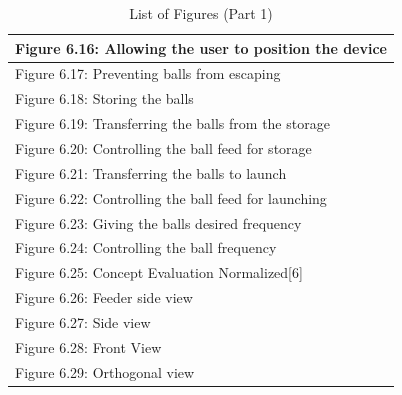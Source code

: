 \documentclass[12pt]{report}
\begin{document}
\begin{table}[h!]
\begin{tabular}{|p{15cm}|}
Figure 6.16: Allowing the user to position the device \\ \hline
Figure 6.17: Preventing balls from escaping \\ \hline
Figure 6.18: Storing the balls \\ \hline
Figure 6.19: Transferring the balls from the storage \\ \hline
Figure 6.20: Controlling the ball feed for storage \\ \hline
Figure 6.21: Transferring the balls to launch \\ \hline
Figure 6.22: Controlling the ball feed for launching \\ \hline
Figure 6.23: Giving the balls desired frequency \\ \hline
Figure 6.24: Controlling the ball frequency
\\ \hline
Figure 6.25: Concept Evaluation Normalized[6] \\ \hline
Figure 6.26: Feeder side view\\ \hline
Figure 6.27: Side view \\ \hline
Figure 6.28: Front View \\ \hline
Figure 6.29: Orthogonal view \\ \hline

\end{tabular}
\caption{List of Figures (Part 1)}
\label{tab:list_of_figures_part1}
\end{table}
\end{document}
